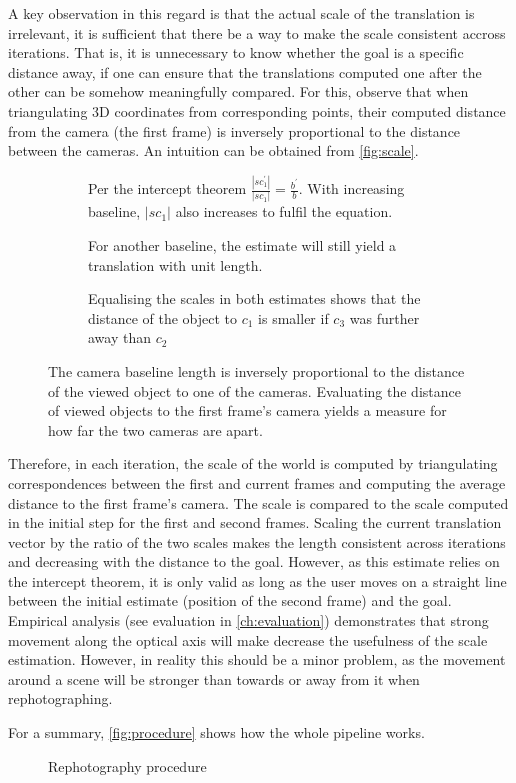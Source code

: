 A key observation in this regard is that the actual scale of the translation is
irrelevant, it is sufficient that there be a way to make the scale consistent
accross iterations. That is, it is unnecessary to know whether the goal is a
specific distance away, if one can ensure that the translations computed one
after the other can be somehow meaningfully compared. For this, \citet{bae2010}
observe that when triangulating 3D coordinates from corresponding points, their
computed distance from the camera (the first frame) is inversely proportional
to the distance between the cameras. An intuition can be obtained from
\autoref{fig:scale}.

\begin{figure}
   {\centering      
      \begin{subfigure}{\linewidth}
      
      \caption{Per the intercept theorem $\frac{|s c_1^\prime|}{|s c_1|} = \frac{b^\prime}{b}$.  
      With increasing baseline, $|s c_1|$ also increases to fulfil the equation.}
      \end{subfigure}

      \begin{subfigure}{\linewidth}
      
      \caption{For another baseline, the estimate will still yield a translation
      with unit length.}
      \end{subfigure}

      \begin{subfigure}{\linewidth}
      
      \caption{Equalising the scales in both estimates shows that the distance
      of the object to $c_1$ is smaller if $c_3$ was further away than $c_2$}
      \end{subfigure}

      \caption[Relation between object distance and camera baseline]{The camera
         baseline length is inversely proportional to the distance of the viewed
      object to one of the cameras. Evaluating the distance of viewed objects to
   the first frame's camera yields a measure for how far the two cameras are
apart.}
   \label{fig:scale}}
\end{figure}

Therefore, in each iteration, the scale of the world is computed by
triangulating correspondences between the first and current frames and computing
the average distance to the first frame's camera. The scale is
compared to the scale computed in the initial step for the first and second
frames. Scaling the current translation vector by the ratio of the
two scales makes the length consistent across iterations and decreasing with the
distance to the goal. However, as this estimate relies on the intercept theorem,
it is only valid as long as the user moves on a straight line between the
initial estimate (position of the second frame) and the goal. Empirical
analysis (see evaluation in \autoref{ch:evaluation}) demonstrates that strong
movement along the optical axis will make decrease the usefulness of the scale
estimation. However, in reality this should be a minor problem, as the movement
around a scene will be stronger than towards or away from it when
rephotographing.

For a summary, \autoref{fig:procedure} shows how the whole pipeline works.
\begin{figure}[h]
   {\centering      
      
      \caption{Rephotography procedure}
   \label{fig:procedure}}
\end{figure}
